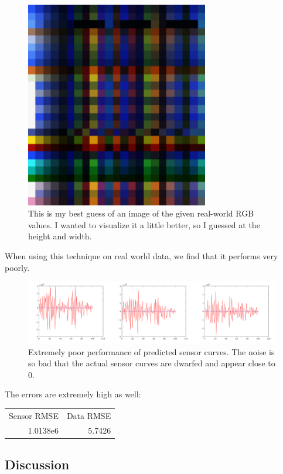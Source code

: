 \documentclass{article}
\begin{document}
\begin{figure}[!ht]
	\centering
	\includegraphics[width=80mm]{figs/real_data.png}
	\caption{This is my best guess of an image of the given real-world RGB 
        values. I wanted to visualize it a little better, so I guessed at the 
        height and width.}
\end{figure}

When using this technique on real world data, we find that it performs very poorly.

\begin{figure}[!ht]
	\centering
	\includegraphics[width=160mm]{figs/sensors_unconstrained_chanall.png}
	\caption{Extremely poor performance of predicted sensor curves. The noise is 
        so bad that the actual sensor curves are dwarfed and appear close to 0.}
\end{figure}

The errors are extremely high as well:

\begin{tabular}{r r}
    Sensor RMSE & Data RMSE \\
    1.0138e6    & 5.7426    \\
\end{tabular}

\subsection{Discussion}
\end{document}
